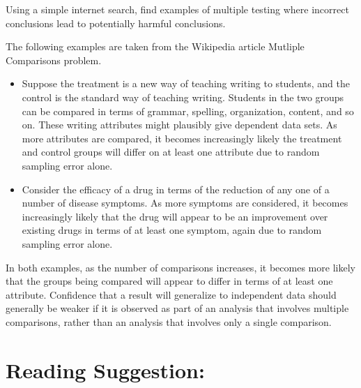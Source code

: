 \documentclass[12pt]{article}
\begin{document}
\begin{exercise}
    Using a simple internet search, find examples of multiple testing
    where incorrect conclusions lead to potentially harmful conclusions.
\end{exercise}
\begin{solution}
    The following examples are taken from the Wikipedia article 
    {Mutliple Comparisons problem.}
    \begin{itemize}
        \item
            Suppose the treatment is a new way of teaching writing to
            students, and the control is the standard way of teaching
            writing.  Students in the two groups can be compared in
            terms of grammar, spelling, organization, content, and so
            on.  These writing attributes might plausibly give dependent
            data sets.  As more attributes are compared, it becomes
            increasingly likely the treatment and control groups will
            differ on at least one attribute due to random sampling
            error alone.
        \item
            Consider the efficacy of a drug in terms of the reduction of
            any one of a number of disease symptoms.  As more symptoms
            are considered, it becomes increasingly likely that the drug
            will appear to be an improvement over existing drugs in
            terms of at least one symptom, again due to random sampling
            error alone.
    \end{itemize}
    In both examples, as the number of comparisons increases, it becomes
    more likely that the groups being compared will appear to differ in
    terms of at least one attribute.  Confidence that a result will
    generalize to independent data should generally be weaker if it is
    observed as part of an analysis that involves multiple comparisons,
    rather than an analysis that involves only a single comparison.

\end{solution}
\hr

\section*{Reading Suggestion:}


\end{document}
